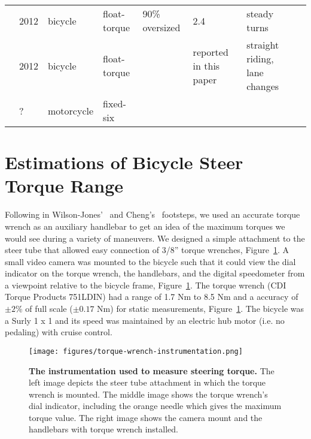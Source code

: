 \documentclass[10pt]{article}
\begin{document}
\begin{landscape}
\begin{table}
\begin{tabular}{llllllll}
    \cite{Cain2010,Cain2012}              &  2012 &     bicycle &      float-torque &    90\% oversized &                      2.4 &                            steady turns &             \\
    \cite{Moore2012}                      &  2012 &     bicycle &      float-torque &                   &   reported in this paper &           straight riding, lane changes &             \\
    \cite{Kageyama}                       &     ? &  motorcycle &         fixed-six &                   &                          &                                         &             \\
    \bottomrule
  \end{tabular}
  \label{tab:design}
\end{table}
\end{landscape}

\section*{Estimations of Bicycle Steer Torque Range}

Following in Wilson-Jones'~\cite{Wilson-Jones1951} and Cheng’s~\cite{Cheng2003}
footsteps, we used an accurate torque wrench as an auxiliary handlebar to get
an idea of the maximum torques we would see during a variety of maneuvers. We
designed a simple attachment to the steer tube that allowed easy connection of
3/8'' torque wrenches, Figure~\ref{fig:torque-wrench-instrumentation}. A small
video camera was mounted to the bicycle such that it could view the dial
indicator on the torque wrench, the handlebars, and the digital speedometer
from a viewpoint relative to the bicycle frame,
Figure~\ref{fig:torque-wrench-instrumentation}.  The torque wrench (CDI Torque
Products 751LDIN) had a range of 1.7 Nm to 8.5 Nm and a accuracy of $\pm2$\% of
full scale ($\pm0.17$ Nm) for static measurements,
Figure~\ref{fig:torque-wrench-instrumentation}. The bicycle was a Surly 1 x 1
and its speed was maintained by an electric hub motor (i.e. no pedaling) with
cruise control.

\begin{figure}
  \centering
  \texttt{[image: figures/torque-wrench-instrumentation.png]}
  \caption{{\bf The instrumentation used to measure steering torque.}
    The left image depicts the steer tube attachment in which the torque wrench
    is mounted. The middle image shows the torque wrench's dial indicator,
    including the orange needle which gives the maximum torque value. The right
    image shows the camera mount and the handlebars with torque wrench
    installed.
    }
  \label{fig:torque-wrench-instrumentation}
\end{figure}
\end{document}
